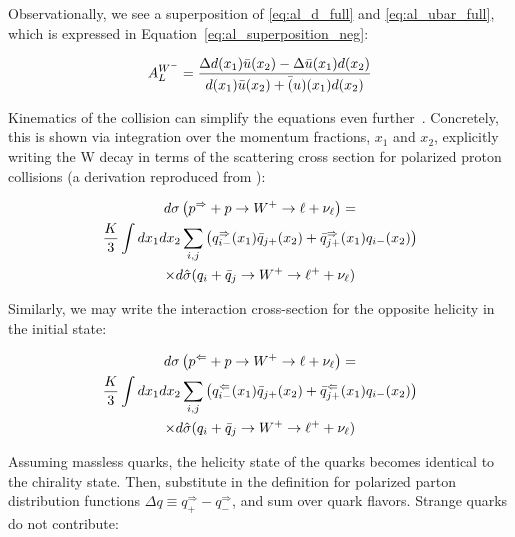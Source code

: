 Observationally, we see a superposition of \ref{eq:al_d_full} and
\ref{eq:al_ubar_full}, which is expressed in
Equation~\ref{eq:al_superposition_neg}:

\begin{equation}
  {A_L^{W^-}} = 
  {
    {
      \Delta d(x_1)\bar{u}(x_2)-\Delta \bar{u}(x_1)d(x_2)
    }
    \over
    {
      d(x_1)\bar u(x_2)+\bar(u)(x_1)d(x_2)
    }
  }
  \label{eq:al_superposition_neg}
\end{equation}

Kinematics of the collision can simplify the equations even
further~\cite{Aidala2005}. Concretely, this is shown via integration over the
momentum fractions, $x_1$ and $x_2$, explicitly writing the W decay in terms of
the scattering cross section for polarized proton collisions (a derivation
reproduced from \cite{Oide2012}):

\begin{multline}
  {
    d\sigma
    \left(
      p^{\Rightarrow}+p\rightarrow W^+\rightarrow \ell+\nu_{\ell}
    \right)
  } 
  = \\
  {
    {K\over3}\int dx_1dx_2\sum_{i,j}
    \left(
    q_{i-}^\Rightarrow(x_1)\bar{q}_{j+}(x_2) +
    \bar{q}_{j+}^\Rightarrow(x_1)q_{i-}(x_2)
    \right)
  }  \\
  \times
  {
    d\hat{\sigma}(q_i+\bar{q}_j\rightarrow W^+\rightarrow \ell^+ + \nu_{\ell})
  }
\end{multline}

{\noindent}Similarly, we may write the interaction cross-section for the
opposite helicity in the initial state:

\begin{multline}
  {
    d\sigma
    \left(
      p^{\Leftarrow}+p\rightarrow W^+\rightarrow \ell+\nu_{\ell}
    \right)
  } 
  = \\
  {
    {K\over3}\int dx_1dx_2\sum_{i,j}
    \left(
    q_{i-}^\Leftarrow(x_1)\bar{q}_{j+}(x_2) +
    \bar{q}_{j+}^\Leftarrow(x_1)q_{i-}(x_2)
    \right)
  }  \\
  \times
  {
    d\hat{\sigma}(q_i+\bar{q}_j\rightarrow W^+\rightarrow \ell^+ + \nu_{\ell})
  }
\end{multline}

Assuming massless quarks, the helicity state of the quarks becomes  identical to
the chirality state. Then, substitute in the definition for polarized parton
distribution functions $\Delta q \equiv q_{+}^{\Rightarrow} -
q_{-}^{\Rightarrow}$, and sum over quark flavors. Strange quarks do not
contribute:

